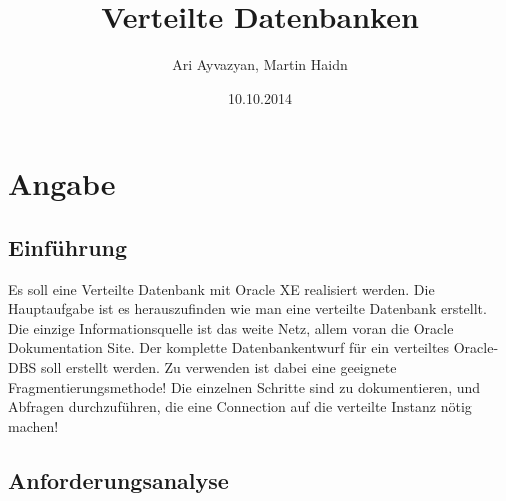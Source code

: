 \documentclass[12pt,a4paper]{report}
\date{10.10.2014}
\author{Ari Ayvazyan, Martin Haidn}
\title{Verteilte Datenbanken}
\begin{document}
\maketitle
\tableofcontents
	\chapter{Angabe}
	\section{Einführung}
	
	Es soll eine Verteilte Datenbank mit Oracle XE realisiert werden. Die Hauptaufgabe ist es herauszufinden wie man eine verteilte Datenbank erstellt. Die einzige Informationsquelle ist das weite Netz, allem voran die Oracle Dokumentation Site. Der komplette Datenbankentwurf für ein
	verteiltes Oracle-DBS soll erstellt werden. Zu verwenden ist dabei eine geeignete
	Fragmentierungsmethode! Die einzelnen Schritte sind zu dokumentieren, und Abfragen
	durchzuführen, die eine Connection auf die verteilte Instanz nötig machen!
	\section{Anforderungsanalyse}
	
\end{document}
